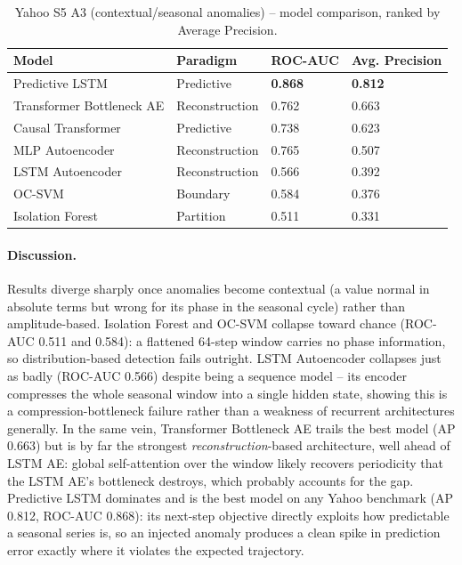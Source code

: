 \begin{table}[h]
\centering
\begin{tabular}{@{}llll@{}}
\toprule
Model & Paradigm & ROC-AUC & Avg. Precision \\
\midrule
Predictive LSTM            & Predictive     & \textbf{0.868} & \textbf{0.812} \\
Transformer Bottleneck AE  & Reconstruction & 0.762          & 0.663 \\
Causal Transformer         & Predictive     & 0.738          & 0.623 \\
MLP Autoencoder            & Reconstruction & 0.765          & 0.507 \\
LSTM Autoencoder           & Reconstruction & 0.566          & 0.392 \\
OC-SVM                     & Boundary       & 0.584          & 0.376 \\
Isolation Forest           & Partition      & 0.511          & 0.331 \\
\bottomrule
\end{tabular}
\caption{Yahoo S5 A3 (contextual/seasonal anomalies) -- model comparison, ranked by Average Precision.}
\label{tab:yahoo-a3}
\end{table}

\paragraph{Discussion.} Results diverge sharply once anomalies become contextual (a value normal in absolute terms but wrong for its phase in the seasonal cycle) rather than amplitude-based. Isolation Forest and OC-SVM collapse toward chance (ROC-AUC 0.511 and 0.584): a flattened 64-step window carries no phase information, so distribution-based detection fails outright. 
LSTM Autoencoder collapses just as badly (ROC-AUC 0.566) despite being a sequence model -- its encoder compresses the whole seasonal window into a single hidden state, showing this is a compression-bottleneck failure rather than a weakness of recurrent architectures generally.
In the same vein, Transformer Bottleneck AE trails the best model (AP 0.663) but is by far the strongest \emph{reconstruction}-based architecture, well ahead of LSTM AE: global self-attention over the window likely recovers periodicity that the LSTM AE's bottleneck destroys, which probably accounts for the gap.
Predictive LSTM dominates and is the best model on any Yahoo benchmark (AP 0.812, ROC-AUC 0.868): its next-step objective directly exploits how predictable a seasonal series is, so an injected anomaly produces a clean spike in prediction error exactly where it violates the expected trajectory.


